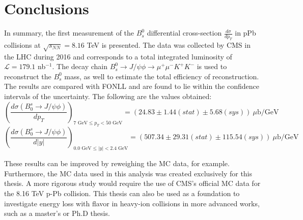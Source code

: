 \chapter[\leavevmode\newline Conclusions]{Conclusions}
\label{chap:Chapter_6}
In summary, the first measurement of the $B^0_s$ differential cross-section $\frac{d\sigma}{dp_T}$ in pPb collisions at $\sqrt{s_{NN}} = 8.16$ TeV is presented. The data was collected by CMS in the LHC during 2016 and corresponds to a total integrated luminosity of $\mathcal L = 179.1$ nb$^{-1}$. The decay chain $B^0_s \to J/\psi \phi \to \mu^{+}\mu^{-} K^{+}K^{-}$ is used to reconstruct the $B^0_s$ mass, as well to estimate the total efficiency of reconstruction. The results are compared with FONLL and are found to lie within the confidence intervals of the uncertainty. The following are the values obtained:
\begin{equation}\left(\frac{d \sigma(B_0^s \to J/\psi\phi)}{dp_T} \right)_{ 7 \text{ GeV} \leq p_T < 50 \text{ GeV}} = (24.83 \pm 1.44(stat) \pm 5.68(sys)) \ \mu\text{b}/\text{GeV}
\end{equation}
\begin{equation}\left(\frac{d \sigma(B_0^s \to J/\psi\phi)}{d|y|} \right)_{ 0.0 \text{ GeV} \leq |y| < 2.4 \text{ GeV}} = (507.34 \pm 29.31(stat) \pm 115.54(sys)) \ \mu\text{b}/\text{GeV}
\end{equation}

These results can be improved by reweighing the MC data, for example. Furthermore, the MC data used in this analysis was created exclusively for this thesis. A more rigorous study would require the use of CMS's official MC data for the 8.16 TeV p-Pb collision. This thesis can also be used as a foundation to investigate energy loss with flavor in heavy-ion collisions in more advanced works, such as a master's or Ph.D thesis.